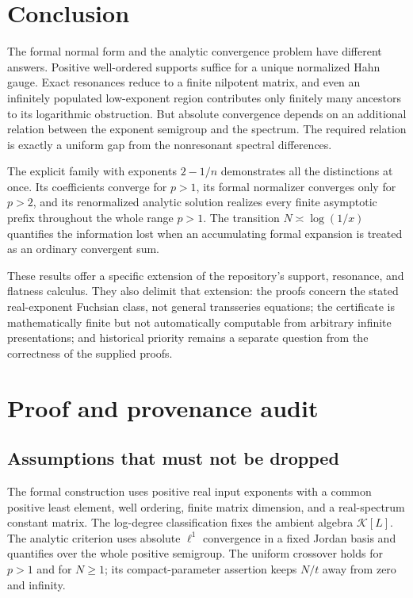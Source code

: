 \documentclass[11pt,a4paper]{article}
\numberwithin{equation}{section}
\theoremstyle{definition}
\theoremstyle{remark}
\newcommand{\K}{\mathcal K}
\begin{document}
\section{Conclusion}
\label{sec:conclusion}

The formal normal form and the analytic convergence problem have different
answers. Positive well-ordered supports suffice for a unique normalized
Hahn gauge. Exact resonances reduce to a finite nilpotent matrix, and even
an infinitely populated low-exponent region contributes only finitely many
ancestors to its logarithmic obstruction. But absolute convergence depends
on an additional relation between the exponent semigroup and the spectrum.
The required relation is exactly a uniform gap from the nonresonant
spectral differences.

The explicit family with exponents $2-1/n$ demonstrates all the distinctions
at once. Its coefficients converge for $p>1$, its formal normalizer
converges only for $p>2$, and its renormalized analytic solution realizes
every finite asymptotic prefix throughout the whole range $p>1$. The
transition $N\asymp\log(1/x)$ quantifies the information lost when an
accumulating formal expansion is treated as an ordinary convergent sum.

These results offer a specific extension of the repository's support,
resonance, and flatness calculus. They also delimit that extension: the
proofs concern the stated real-exponent Fuchsian class, not general
transseries equations; the certificate is mathematically finite but not
automatically computable from arbitrary infinite presentations; and
historical priority remains a separate question from the correctness of
the supplied proofs.

\appendix
\section{Proof and provenance audit}
\label{sec:audit}

\subsection{Assumptions that must not be dropped}
The formal construction uses positive real input exponents with a common
positive least element, well ordering, finite matrix dimension, and a
real-spectrum constant matrix. The log-degree classification fixes the
ambient algebra $\K[L]$. The analytic criterion uses absolute
$\ell^1$ convergence in a fixed Jordan basis and quantifies over the whole
positive semigroup. The uniform crossover holds for $p>1$ and for $N\geq1$;
its compact-parameter assertion keeps $N/t$ away from zero and infinity.
\end{document}
